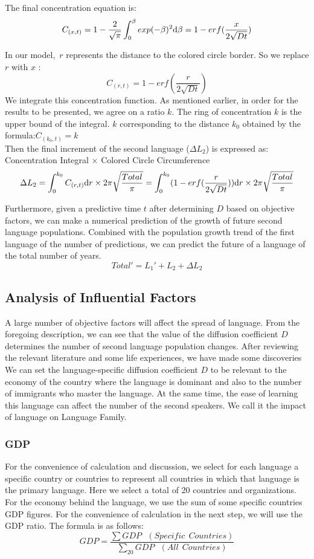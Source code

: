 \documentclass{mcmthesis}
\begin{document}
    The final concentration equation is:
    $$C_{(x,t)}=1-\frac{2}{\sqrt{\pi}}\int_0^\beta exp(-\beta)^2{\rm d}\beta=1-erf(\frac{x}{2\sqrt{Dt}})$$

    In our model,\ $r$ represents the distance to the colored circle border.
    So we replace $r$ with $x$ :
    $$C_{(r,t)}=1-erf(\frac{r}{2\sqrt{Dt}})$$
    We integrate this concentration function.
    As mentioned earlier, in order for the results to be presented, we agree on a ratio $k$.
    The ring of concentration $k$ is the upper bound of the integral.
    $k$ corresponding to the distance $k_0$ obtained by the formula:$C_{(k_0,t)}=k$
    \\Then the final increment of the second language ($\Delta L_2$) is expressed as:
    Concentration Integral × Colored Circle Circumference
    $$\Delta L_2=\int_0^{k_0} C_{(r,t)}{\rm d}r\times 2\pi\sqrt{\frac{Total}{\pi}}=\int_0^{k_0}(1-erf(\frac{r}{2\sqrt{Dt}})){\rm d}r\times 2\pi\sqrt{\frac{Total}{\pi}}$$

    Furthermore, given a predictive time $t$ after determining $D$ based on objective factors,
    we can make a numerical prediction of the growth of future second language populations.
    Combined with the population growth trend of the first language of the number of predictions,
    we can predict the future of a language of the total number of years.
    $$Total'=L_1'+L_2+\Delta L_2$$



    \subsection{Analysis of Influential Factors}%
    A large number of objective factors will affect the spread of language.
    From the foregoing description, we can see that the value of the diffusion coefficient $D$ determines the number of second language population changes.
    After reviewing the relevant literature and some life experiences, we have made some discoveries
    We can set the language-specific diffusion coefficient $D$ to be relevant to the economy of the country
    where the language is dominant and also to the number of immigrants who master the language.
    At the same time, the ease of learning this language can affect the number of the second speakers.
    We call it the impact of language on Language Family.
      \subsubsection{GDP}
    For the convenience of calculation and discussion, we select for each language a specific country or countries to represent all countries in which that language is the primary language.
    Here we select a total of 20 countries and organizations.
    For the economy behind the language, we use the sum of some specific countries GDP figures.
    For the convenience of calculation in the next step, we will use the GDP ratio.
    The formula is as follows:
    $$GDP=\frac{\sum GDP\ \ \ (Specific\ \  Countries)}{\sum_{20} GDP\ \ \ (All\ \  Countries)}$$
\end{document}
